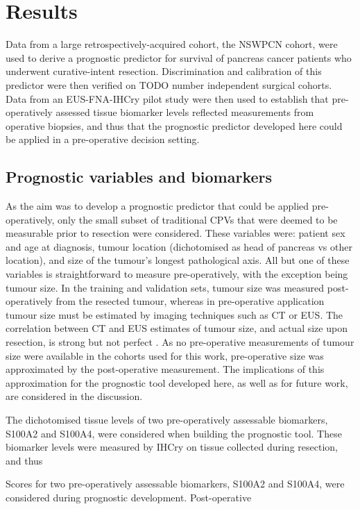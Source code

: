 \documentclass[dissertation.tex]{subfiles}
\begin{document}
\section{Results}
Data from a large retrospectively-acquired cohort, the \gls{NSWPCN} cohort, were used to derive a prognostic predictor for survival of pancreas cancer patients who underwent curative-intent resection.  Discrimination and calibration of this predictor were then verified on TODO number independent surgical cohorts.  Data from an \gls{EUS}-\gls{FNA}-\acrshort{IHCry} pilot study were then used to establish that pre-operatively assessed tissue biomarker levels reflected measurements from operative biopsies, and thus that the prognostic predictor developed here could be applied in a pre-operative decision setting.

\subsection{Prognostic variables and biomarkers}
As the aim was to develop a prognostic predictor that could be applied pre-operatively, only the small subset of traditional \glspl{CPV} that were deemed to be measurable prior to resection were considered.  These variables were: patient sex and age at diagnosis, tumour location (dichotomised as head of pancreas vs other location), and size of the tumour's longest pathological axis.  All but one of these variables is straightforward to measure pre-operatively, with the exception being tumour size.  In the training and validation sets, tumour size was measured post-operatively from the resected tumour, whereas in pre-operative application tumour size must be estimated by imaging techniques such as \gls{CT} or \gls{EUS}.  The correlation between \gls{CT} and \gls{EUS} estimates of tumour size, and actual size upon resection, is strong but not perfect \cite{Arvold2011}.  As no pre-operative measurements of tumour size were available in the cohorts used for this work, pre-operative size was approximated by the post-operative measurement.  The implications of this approximation for the prognostic tool developed here, as well as for future work, are considered in the discussion.

The dichotomised tissue levels of two pre-operatively assessable biomarkers, S100A2 and S100A4, were considered when building the prognostic tool.  These biomarker levels were measured by \gls{IHCry} on tissue collected during resection, and thus 

Scores for two pre-operatively assessable biomarkers, S100A2 and S100A4, were considered during prognostic development.  Post-operative
\end{document}
